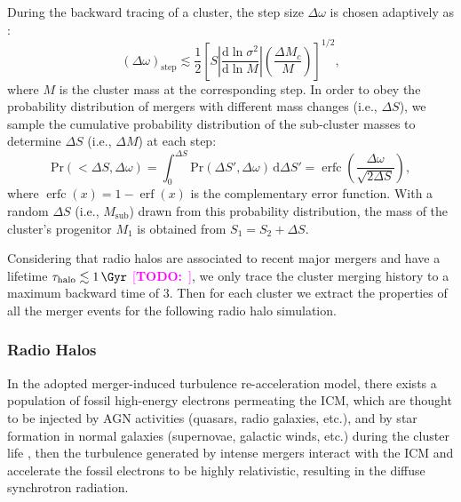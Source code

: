\documentclass[modern]{aastex61}
\newcommand{\R}[1]{\mathrm{#1}}
\newcommand{\D}[1]{\R{d} #1}
\newcommand{\diff}[2]{\frac{\D{#1}}{\D{#2}}}
\newcommand{\TODO}[1]{\textcolor{magenta}{[\textbf{TODO:}~\uuline{#1}]}}
\DeclareMathOperator{\erf}{erf}
\DeclareMathOperator{\erfc}{erfc}
\begin{document}
During the backward tracing of a cluster, the step size $\Delta\omega$
is chosen adaptively as \citep{randall2002}:
\begin{equation}
  \label{sec:dw-step}
  (\Delta\omega)_{\R{step}} \lesssim \frac{1}{2} \left[
    S \left| \diff{\ln \sigma^2}{\ln M} \right|
    \left( \frac{\Delta M_c}{M} \right) \right]^{1/2},
\end{equation}
where $M$ is the cluster mass at the corresponding step.
In order to obey the probability distribution of mergers with different
mass changes (i.e., $\Delta S$),
we sample the cumulative probability distribution of the sub-cluster masses
to determine $\Delta S$ (i.e., $\Delta M$) at each step:
\begin{equation}
  \label{sec:cdf-sub-masses}
  \R{Pr}(<\!\Delta S, \Delta\omega) =
  \int_0^{\Delta S} \R{Pr}(\Delta S', \Delta\omega) \,\D{\Delta S'} =
  \erfc \!\left( \frac{\Delta \omega}{\sqrt{2 \Delta S}} \right),
\end{equation}
where $\erfc(x) = 1 - \erf(x)$ is the complementary error function.
With a random $\Delta S$ (i.e., $M_{\R{sub}}$) drawn from this probability
distribution, the mass of the cluster's progenitor $M_1$ is obtained from
$S_1 = S_2 + \Delta S$.

Considering that radio halos are associated to recent major mergers and
have a lifetime $\tau_{\R{halo}} \lesssim \SI{1}{\Gyr}$
\citep{cassano2016} \TODO{change citation???},
we only trace the cluster merging history to a maximum backward time of
\SI{3}{\Gyr}.
Then for each cluster we extract the properties of all the merger events
for the following radio halo simulation.


\subsubsection{Radio Halos}
\label{sec:halos}

In the adopted merger-induced turbulence re-acceleration model, there
exists a population of fossil high-energy electrons permeating the ICM,
which are thought to be injected by AGN activities (quasars, radio
galaxies, etc.), and by star formation in normal galaxies (supernovae,
galactic winds, etc.) during the cluster life
\citep[see][for a review]{blasi2007rev},
then the turbulence generated by intense mergers interact with the ICM
and accelerate the fossil electrons to be highly relativistic, resulting
in the diffuse synchrotron radiation.
\end{document}
